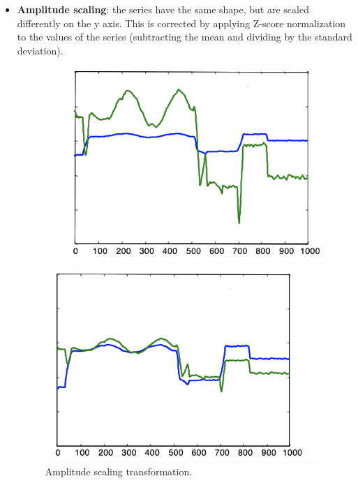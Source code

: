 \begin{itemize}
    \item \textbf{Amplitude scaling}: the series have the same shape, but are scaled differently on the y axis. This is corrected by applying Z-score normalization to the values of the series (subtracting the mean and dividing by the standard deviation).
    \begin{figure}[ht]
        \centering
        \begin{minipage}{0.40\textwidth}
            \includegraphics[width=1.0\linewidth]{img/ampli_scaling_1.png}
        \end{minipage}
        \hfill
        \begin{minipage}{0.40\textwidth}
            \includegraphics[width=1.0\linewidth]{img/ampli_scaling_2.png}
        \end{minipage}
        \caption{Amplitude scaling transformation.}
        \label{fig:ampli-scaling}
    \end{figure}


\end{itemize}

